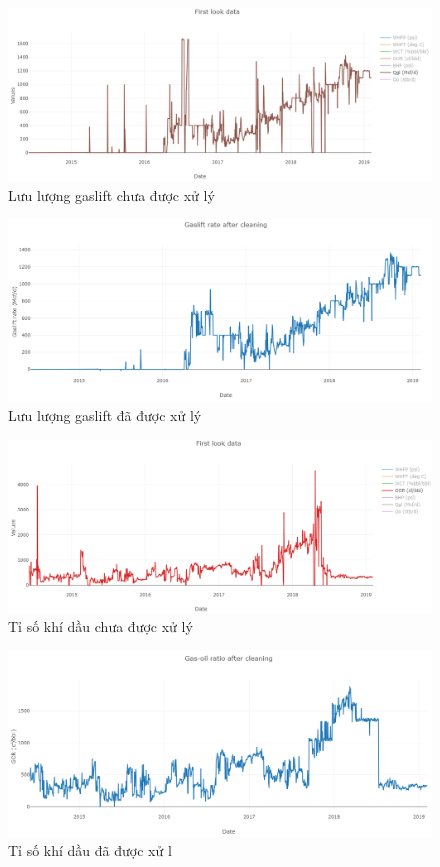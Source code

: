 \documentclass[12pt,a4paper]{report}
\begin{document}
    \begin{figure}[h]
        \centering
        \includegraphics[scale=0.55]{fig/gl_before.PNG}
        \caption{Lưu lượng gaslift chưa được xử lý}
        \label{fig:gl_before}
    \end{figure}
    \begin{figure}[h]
        \centering
        \includegraphics[scale=0.55]{fig/gl_after.PNG}
        \caption{Lưu lượng gaslift đã được xử lý}
        \label{fig:gl_after}
    \end{figure}
    \begin{figure}[h]
        \centering
        \includegraphics[scale=0.55]{fig/gor_before.PNG}
        \caption{Tỉ số khí dầu chưa được xử lý}
        \label{fig:gor_before}
    \end{figure}
    \begin{figure}[h]
        \centering
        \includegraphics[scale=0.55]{fig/gor_after.PNG}
        \caption{Tỉ số khí dầu đã được xử l}
        \label{fig:gor_after}
    \end{figure}
\end{document}
